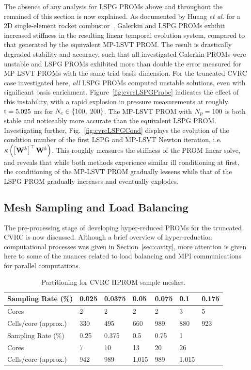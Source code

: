 The absence of any analysis for LSPG PROMs above and throughout the remained of this section is now explained. As documented by Huang \textit{et al.} for a 2D single-element rocket combustor~\cite{Huang2022}, Galerkin and LSPG PROMs exhibit increased stiffness in the resulting linear temporal evolution system, compared to that generated by the equivalent MP-LSVT PROM. The result is drastically degraded stability and accuracy, such that all investigated Galerkin PROMs were unstable and LSPG PROMs exhibited more than double the error measured for MP-LSVT PROMs with the same trial basis dimension. For the truncated CVRC case investigated here, \textit{all} LSPG PROMs computed unstable solutions, even with significant basis enrichment. Figure~\ref{fig:cvrcLSPGProbe} indicates the effect of this instability, with a rapid explosion in pressure measurements at roughly $\text{t} = 5.025$ ms for $N_c \in \{100, \; 200\}$. The MP-LSVT PROM with $N_p = 100$ is both stable and noticeably more accurate than the equivalent LSPG PROM. Investigating further, Fig.~\ref{fig:cvrcLSPGCond} displays the evolution of the condition number of the first LSPG and MP-LSVT Newton iteration, i.e. $\kappa \left(\left[\testBasis^{\newtonIdx}\right]^\top \testBasis^{\newtonIdx}\right)$. This roughly measures the stiffness of the PROM linear solve, and reveals that while both methods experience similar ill conditioning at first, the conditioning of the MP-LSVT PROM gradually lessens while that of the LSPG PROM gradually increases and eventually explodes.

\subsection{Mesh Sampling and Load Balancing}

The pre-processing stage of developing hyper-reduced PROMs for the truncated CVRC is now discussed. Although a brief overview of hyper-reduction computational processes was given in Section~\ref{sec:cavity}, more attention is given here to some of the nuances related to load balancing and MPI communications for parallel computations.

\begin{table}
	\centering
	\begin{tabular}{ lllllll }
	\toprule
	Sampling Rate (\%) & 0.025 & 0.0375 & 0.05 & 0.075 & 0.1 & 0.175 \\
	\midrule
	Cores & 2 & 2 & 2 & 2 & 3 & 5 \\
	Cells/core (approx.) & 330 & 495 & 660 & 989 & 880 & 923 \\
	\bottomrule
	\toprule
	Sampling Rate (\%) & 0.25 & 0.375 & 0.5 & 0.75 & 1 &  \\
	\midrule
	Cores & 7 & 10 & 13 & 20 & 26 & \\
	Cells/core (approx.) & 942 & 989 & 1,015 & 989 & 1,015 & \\
	\bottomrule
	\end{tabular}
	\caption{\label{tab:cvrcSampProcs}Partitioning for CVRC HPROM sample meshes.}
\end{table}

